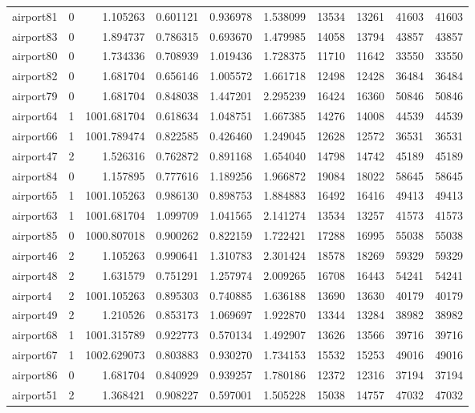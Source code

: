 \begin{longtable}{|l|r|r|r|r|r|r|r|r|r|}
airport81 & 0 & 1.105263 & 0.601121 & 0.936978 & 1.538099 & 13534 & 13261 & 41603 & 41603 \\
airport83 & 0 & 1.894737 & 0.786315 & 0.693670 & 1.479985 & 14058 & 13794 & 43857 & 43857 \\
airport80 & 0 & 1.734336 & 0.708939 & 1.019436 & 1.728375 & 11710 & 11642 & 33550 & 33550 \\
airport82 & 0 & 1.681704 & 0.656146 & 1.005572 & 1.661718 & 12498 & 12428 & 36484 & 36484 \\
airport79 & 0 & 1.681704 & 0.848038 & 1.447201 & 2.295239 & 16424 & 16360 & 50846 & 50846 \\
airport64 & 1 & 1001.681704 & 0.618634 & 1.048751 & 1.667385 & 14276 & 14008 & 44539 & 44539 \\
airport66 & 1 & 1001.789474 & 0.822585 & 0.426460 & 1.249045 & 12628 & 12572 & 36531 & 36531 \\
airport47 & 2 & 1.526316 & 0.762872 & 0.891168 & 1.654040 & 14798 & 14742 & 45189 & 45189 \\
airport84 & 0 & 1.157895 & 0.777616 & 1.189256 & 1.966872 & 19084 & 18022 & 58645 & 58645 \\
airport65 & 1 & 1001.105263 & 0.986130 & 0.898753 & 1.884883 & 16492 & 16416 & 49413 & 49413 \\
airport63 & 1 & 1001.681704 & 1.099709 & 1.041565 & 2.141274 & 13534 & 13257 & 41573 & 41573 \\
airport85 & 0 & 1000.807018 & 0.900262 & 0.822159 & 1.722421 & 17288 & 16995 & 55038 & 55038 \\
airport46 & 2 & 1.105263 & 0.990641 & 1.310783 & 2.301424 & 18578 & 18269 & 59329 & 59329 \\
airport48 & 2 & 1.631579 & 0.751291 & 1.257974 & 2.009265 & 16708 & 16443 & 54241 & 54241 \\
airport4 & 2 & 1001.105263 & 0.895303 & 0.740885 & 1.636188 & 13690 & 13630 & 40179 & 40179 \\
airport49 & 2 & 1.210526 & 0.853173 & 1.069697 & 1.922870 & 13344 & 13284 & 38982 & 38982 \\
airport68 & 1 & 1001.315789 & 0.922773 & 0.570134 & 1.492907 & 13626 & 13566 & 39716 & 39716 \\
airport67 & 1 & 1002.629073 & 0.803883 & 0.930270 & 1.734153 & 15532 & 15253 & 49016 & 49016 \\
airport86 & 0 & 1.681704 & 0.840929 & 0.939257 & 1.780186 & 12372 & 12316 & 37194 & 37194 \\
airport51 & 2 & 1.368421 & 0.908227 & 0.597001 & 1.505228 & 15038 & 14757 & 47032 & 47032 \\

\end{longtable}
